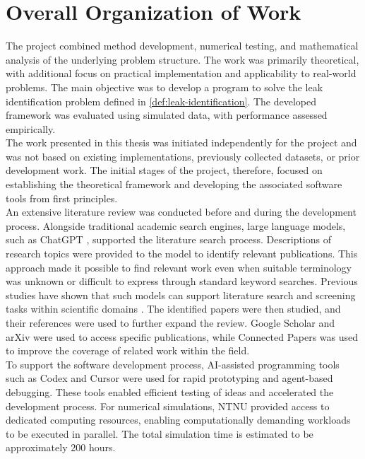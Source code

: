 \newpage
\section{Overall Organization of Work}

The project combined method development, numerical testing, and mathematical analysis of the underlying problem structure. The work was primarily theoretical, with additional focus on practical implementation and applicability to real-world problems. The main objective was to develop a program to solve the leak identification problem defined in \autoref{def:leak-identification}. The developed framework was evaluated using simulated data, with performance assessed empirically.\\

The work presented in this thesis was initiated independently for the project and was not based on existing implementations, previously collected datasets, or prior development work. The initial stages of the project, therefore, focused on establishing the theoretical framework and developing the associated software tools from first principles.\\

An extensive literature review was conducted before and during the development process. Alongside traditional academic search engines, large language models, such as ChatGPT \cite{chatgpt}, supported the literature search process. Descriptions of research topics were provided to the model to identify relevant publications. This approach made it possible to find relevant work even when suitable terminology was unknown or difficult to express through standard keyword searches. Previous studies have shown that such models can support literature search and screening tasks within scientific domains \cite{jin2024pubmedandbeyond,dennstadt2024titleandabstract,delgado-chaves2025transforming}. The identified papers were then studied, and their references were used to further expand the review. Google Scholar and arXiv were used to access specific publications, while Connected Papers \cite{connectedpapers} was used to improve the coverage of related work within the field.\\

To support the software development process, AI-assisted programming tools such as Codex \cite{codex} and Cursor \cite{cursor} were used for rapid prototyping and agent-based debugging. These tools enabled efficient testing of ideas and accelerated the development process. For numerical simulations, NTNU provided access to dedicated computing resources, enabling computationally demanding workloads to be executed in parallel. The total simulation time is estimated to be approximately 200 hours.\\

